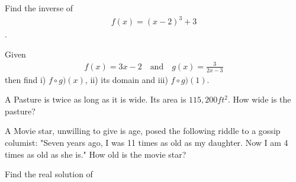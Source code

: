 \documentclass[11pt]{exam}
\begin{document}
\begin{questions}

\addpoints
\question[10] Find the inverse of 
\begin{align*}
f(x)=(x-2)^3+3
\end{align*}.

\newpage
\addpoints
\question[12] Given 
\begin{align*}
f(x)=3x-2\quad \mbox{and} \quad g(x)=\frac{3}{2x-3}
\end{align*} 
then find i) $f\circ g)(x)$, ii) its domain and iii) $f\circ g)(1)$.

\vspace{8cm}
\addpoints
\question[10] A Pasture is twice as long as it is wide. Its area is $115,200 ft^2$. How wide is the pasture?

\vspace{8cm}
\newpage
\addpoints
\question[10] A Movie star, unwilling to give is age, posed the following riddle to a gossip columist: "Seven years ago, I was 11 times as old as my daughter. Now I am 4 times as old as she is." How old is the movie star?

\vspace{8cm}
\addpoints
\question[10] Find the real solution of 

\noaddpoints %
\end{questions}
\end{document}
